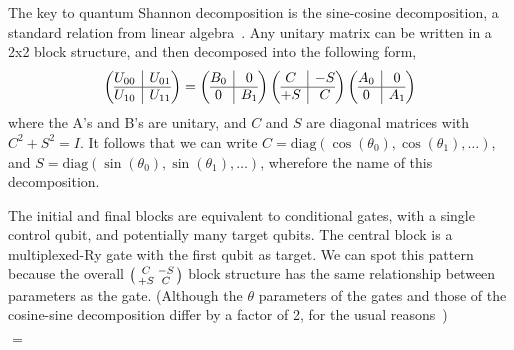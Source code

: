 The key to quantum Shannon decomposition is the sine-cosine decomposition, a standard relation from linear algebra~\cite{???}. Any unitary matrix can be written in a 2x2 block structure, and then decomposed into the following form, 
\[
\left(\begin{array}{@{}c|c@{}}
  U_{00}
  & U_{01} \\
\hline
  U_{10} &
  U_{11}   
\end{array}\right)
=
\left(\begin{array}{@{}c|c@{}}
B_0
  & 0 \\
\hline
  0 &
B_1
\end{array}\right)
\left(\begin{array}{@{}c|c@{}}
C
  & -S \\
\hline
  +S &
C
\end{array}\right)
\left(\begin{array}{@{}c|c@{}}
A_0
  & 0 \\
\hline
  0 &
A_1
\end{array}\right)
\]
where the A's and B's are unitary, and $C$ and $S$ are diagonal matrices with $C^2+S^2=I$. It follows that we can write $C=\text{diag}(\cos(\theta_0), \cos(\theta_1), \ldots)$, and $S=\text{diag}(\sin(\theta_0), \sin(\theta_1), \ldots)$, wherefore the name of this decomposition. 

The initial and final blocks are equivalent to conditional gates, with a single control qubit, and potentially many target qubits. The central block is a multiplexed-Ry gate with the first qubit as target. We can spot this pattern because the overall $\begin{psmallmatrix}C & -S\\ +S & C\end{psmallmatrix}$ block structure has the same relationship between parameters as the  gate. (Although the $\theta$ parameters of the  gates and those of the cosine-sine decomposition differ by a factor of 2, for the usual reasons~\cite{???})



\begin{center}
$ = $
\end{center}




